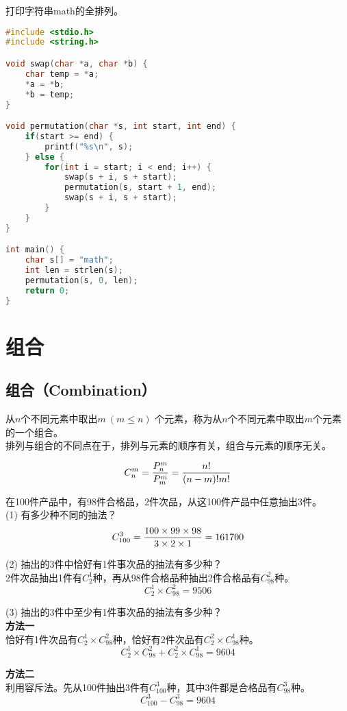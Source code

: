 \begin{tcolorbox}
	打印字符串math的全排列。
\end{tcolorbox}

\begin{lstlisting}[language=C, title=全排列]
#include <stdio.h>
#include <string.h>

void swap(char *a, char *b) {
	char temp = *a;
	*a = *b;
	*b = temp;
}

void permutation(char *s, int start, int end) {
	if(start >= end) {
		printf("%s\n", s);
	} else {
		for(int i = start; i < end; i++) {
			swap(s + i, s + start);
			permutation(s, start + 1, end);
			swap(s + i, s + start);
		}
	}
}

int main() {
	char s[] = "math";
	int len = strlen(s);
	permutation(s, 0, len);
	return 0;
}
\end{lstlisting}

\newpage

\section{组合}

\subsection{组合（Combination）}

从$ n $个不同元素中取出$ m\ (m \le n) $ 个元素，称为从$ n $个不同元素中取出$ m $个元素的一个组合。\\

排列与组合的不同点在于，排列与元素的顺序有关，组合与元素的顺序无关。

\vspace{-1cm}

\begin{align}
	C_n^m = {P_n^m \over P_m^m} = {n! \over (n-m)!m!}
\end{align}

\begin{tcolorbox}
	在100件产品中，有98件合格品，2件次品，从这100件产品中任意抽出3件。\\
	(1) 有多少种不同的抽法？
	$$
		C_{100}^3 = {100 \times 99 \times 98 \over 3 \times 2 \times 1} = 161700
	$$

	(2) 抽出的3件中恰好有1件事次品的抽法有多少种？\\
	2件次品抽出1件有$ C_2^1 $种，再从98件合格品种抽出2件合格品有$ C_{98}^2 $种。
	$$
		C_2^1 \times C_{98}^2 = 9506
	$$

	(3) 抽出的3件中至少有1件事次品的抽法有多少种？\\
	\textbf{方法一}\\
	恰好有1件次品有$ C_2^1 \times C_{98}^2 $种，恰好有2件次品有$ C_2^2 \times C_{98}^1 $种。
	$$
		C_2^1 \times C_{98}^2 + C_2^2 \times C_{98}^1 = 9604
	$$

	\textbf{方法二}\\
	利用容斥法。先从100件抽出3件有$ C_{100}^3 $种，其中3件都是合格品有$ C_{98}^3 $种。
	$$
		C_{100}^3 - C_{98}^3 = 9604
	$$
\end{tcolorbox}

